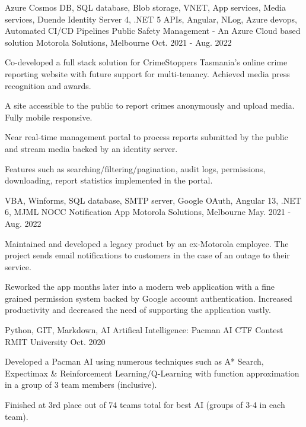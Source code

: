 \begin{cventries}
{\begin{cvitems}
      \end{cvitems}
    }
  \cventry
    {Azure Cosmos DB, SQL database, Blob storage, VNET, App services, Media services, Duende Identity Server 4, .NET 5 APIs, Angular, NLog, Azure devops, Automated CI/CD Pipelines}
    {Public Safety Management - An Azure Cloud based solution}
    {Motorola Solutions, Melbourne}
    {Oct. 2021 - Aug. 2022}
    {
      \begin{cvitems}
        \item {Co-developed a full stack solution for CrimeStoppers Tasmania's online crime reporting website with future support for multi-tenancy. Achieved media press recognition and awards.}
        \item {A site accessible to the public to report crimes anonymously and upload media. Fully mobile responsive.}
        \item {Near real-time management portal to process reports submitted by the public and stream media backed by an identity server.}
        \item {Features such as searching/filtering/pagination, audit logs, permissions, downloading, report statistics implemented in the portal.}
      \end{cvitems}
    }
  \cventry
    {VBA, Winforms, SQL database, SMTP server, Google OAuth, Angular 13, .NET 6, MJML}
    {NOCC Notification App}
    {Motorola Solutions, Melbourne}
    {May. 2021 - Aug. 2022}
    {
      \begin{cvitems}
        \item {Maintained and developed a legacy product by an ex-Motorola employee. The project sends email notifications to customers in the case of an outage to their service.}
        \item {Reworked the app months later into a modern web application with a fine grained permission system backed by Google account authentication. Increased productivity and decreased the need of supporting the application vastly.}
      \end{cvitems}
    }
  \cventry
    {Python, GIT, Markdown, AI}
    {Artifical Intelligence: Pacman AI CTF Contest}
    {RMIT University}
    {Oct. 2020}
    {
      \begin{cvitems}
        \item {Developed a Pacman AI using numerous techniques such as A* Search, Expectimax \& Reinforcement Learning/Q-Learning with function approximation in a group of 3 team members (inclusive).}
        \item {Finished at 3rd place out of 74 teams total for best AI (groups of 3-4 in each team).}
      \end{cvitems}
    }
\end{cventries}
